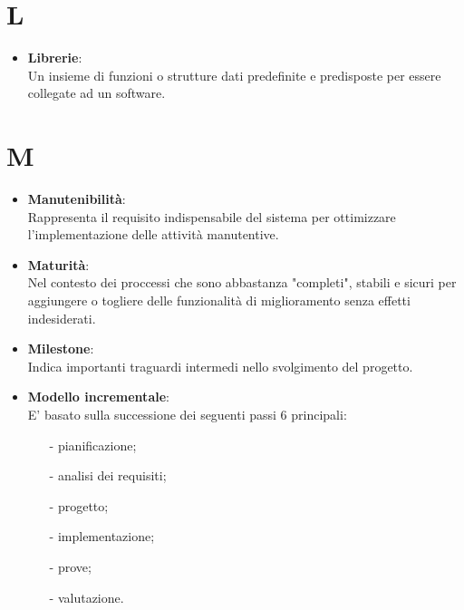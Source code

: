 \documentclass[a4paper, oneside, openany, dvipsnames, table]{article}
\begin{document}
\newpage
\section{L}
\begin{itemize}
\item \textbf{Librerie}:\\	Un insieme di funzioni o strutture dati predefinite e predisposte per essere collegate ad un software.
\end{itemize}


\newpage
\section{M}
\begin{itemize}
\item \textbf{Manutenibilità}:\\	Rappresenta il requisito indispensabile del sistema per ottimizzare l'implementazione delle attività manutentive.
\end{itemize}

\begin{itemize}
\item \textbf{Maturità}:\\	Nel contesto dei proccessi che sono abbastanza "completi", stabili e sicuri per aggiungere o togliere delle funzionalità di  miglioramento senza effetti indesiderati.
\end{itemize}

\begin{itemize}
\item \textbf{Milestone}:\\		Indica importanti traguardi intermedi nello svolgimento del progetto.
\end{itemize}

\begin{itemize}
\item \textbf{Modello incrementale}:\\	E' basato sulla successione dei seguenti passi 6 principali:
\begin{itemize}
\item[-]pianificazione;
\item[-]analisi dei requisiti;
\item[-]progetto;
\item[-]implementazione;
\item[-]prove;
\item[-]valutazione.
\end{itemize}
\end{itemize}
\end{document}
